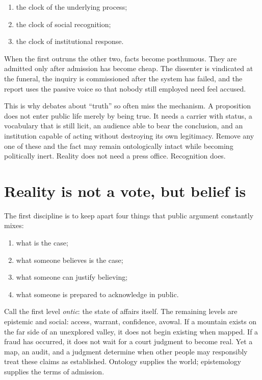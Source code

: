 ﻿\documentclass[12pt,a4paper]{book}
\begin{document}
\begin{enumerate}
  \item the clock of the underlying process;
  \item the clock of social recognition;
  \item the clock of institutional response.
\end{enumerate}

When the first outruns the other two, facts become posthumous. They are admitted only after admission has become cheap. The dissenter is vindicated at the funeral, the inquiry is commissioned after the system has failed, and the report uses the passive voice so that nobody still employed need feel accused.

This is why debates about “truth” so often miss the mechanism. A proposition does not enter public life merely by being true. It needs a carrier with status, a vocabulary that is still licit, an audience able to bear the conclusion, and an institution capable of acting without destroying its own legitimacy. Remove any one of these and the fact may remain ontologically intact while becoming politically inert. Reality does not need a press office. Recognition does.

\section{Reality is not a vote, but belief is}

The first discipline is to keep apart four things that public argument constantly mixes:

\begin{enumerate}
  \item what is the case;
  \item what someone believes is the case;
  \item what someone can justify believing;
  \item what someone is prepared to acknowledge in public.
\end{enumerate}

Call the first level \emph{ontic}: the state of affairs itself. The remaining levels are epistemic and social: access, warrant, confidence, avowal. If a mountain exists on the far side of an unexplored valley, it does not begin existing when mapped. If a fraud has occurred, it does not wait for a court judgment to become real. Yet a map, an audit, and a judgment determine when other people may responsibly treat these claims as established. Ontology supplies the world; epistemology supplies the terms of admission.
\end{document}
